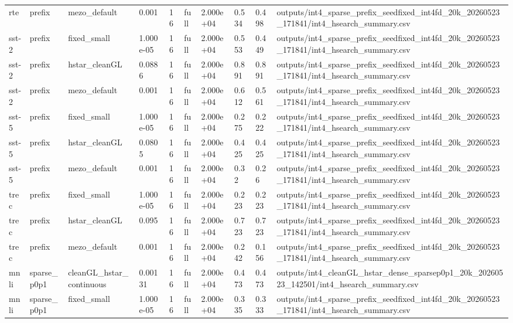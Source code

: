 \begin{table}[t]
\begin{tabular}{llllllllll}
rte & prefix & mezo\_default & 0.001 & 16 & full & 2.000e+04 & 0.534 & 0.498 & outputs/int4\_sparse\_prefix\_seedfixed\_int4fd\_20k\_20260523\_171841/int4\_hsearch\_summary.csv \\
sst-2 & prefix & fixed\_small & 1.000e-05 & 16 & full & 2.000e+04 & 0.553 & 0.449 & outputs/int4\_sparse\_prefix\_seedfixed\_int4fd\_20k\_20260523\_171841/int4\_hsearch\_summary.csv \\
sst-2 & prefix & hstar\_cleanGL & 0.0886 & 16 & full & 2.000e+04 & 0.891 & 0.891 & outputs/int4\_sparse\_prefix\_seedfixed\_int4fd\_20k\_20260523\_171841/int4\_hsearch\_summary.csv \\
sst-2 & prefix & mezo\_default & 0.001 & 16 & full & 2.000e+04 & 0.612 & 0.561 & outputs/int4\_sparse\_prefix\_seedfixed\_int4fd\_20k\_20260523\_171841/int4\_hsearch\_summary.csv \\
sst-5 & prefix & fixed\_small & 1.000e-05 & 16 & full & 2.000e+04 & 0.275 & 0.222 & outputs/int4\_sparse\_prefix\_seedfixed\_int4fd\_20k\_20260523\_171841/int4\_hsearch\_summary.csv \\
sst-5 & prefix & hstar\_cleanGL & 0.0805 & 16 & full & 2.000e+04 & 0.425 & 0.425 & outputs/int4\_sparse\_prefix\_seedfixed\_int4fd\_20k\_20260523\_171841/int4\_hsearch\_summary.csv \\
sst-5 & prefix & mezo\_default & 0.001 & 16 & full & 2.000e+04 & 0.32 & 0.26 & outputs/int4\_sparse\_prefix\_seedfixed\_int4fd\_20k\_20260523\_171841/int4\_hsearch\_summary.csv \\
trec & prefix & fixed\_small & 1.000e-05 & 16 & full & 2.000e+04 & 0.223 & 0.223 & outputs/int4\_sparse\_prefix\_seedfixed\_int4fd\_20k\_20260523\_171841/int4\_hsearch\_summary.csv \\
trec & prefix & hstar\_cleanGL & 0.095 & 16 & full & 2.000e+04 & 0.723 & 0.723 & outputs/int4\_sparse\_prefix\_seedfixed\_int4fd\_20k\_20260523\_171841/int4\_hsearch\_summary.csv \\
trec & prefix & mezo\_default & 0.001 & 16 & full & 2.000e+04 & 0.242 & 0.156 & outputs/int4\_sparse\_prefix\_seedfixed\_int4fd\_20k\_20260523\_171841/int4\_hsearch\_summary.csv \\
mnli & sparse\_p0p1 & cleanGL\_hstar\_continuous & 0.00131 & 16 & full & 2.000e+04 & 0.473 & 0.473 & outputs/int4\_cleanGL\_hstar\_dense\_sparsep0p1\_20k\_20260523\_142501/int4\_hsearch\_summary.csv \\
mnli & sparse\_p0p1 & fixed\_small & 1.000e-05 & 16 & full & 2.000e+04 & 0.335 & 0.333 & outputs/int4\_sparse\_prefix\_seedfixed\_int4fd\_20k\_20260523\_171841/int4\_hsearch\_summary.csv \\

\end{tabular}
\end{table}
